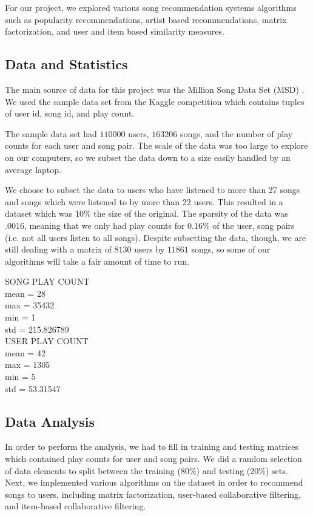 \documentclass[12pt,preprint]{aastex}
\begin{document}
For our project, we explored various song recommendation systems algorithms such as popularity recommendations, artist based recommendations, matrix factorization, and user and item based similarity measures.  

\subsection{Data and Statistics}
The main source of data for this project was the Million Song Data Set (MSD)  \citep{Bertin-Mahieux2011}. We used the sample data set from the Kaggle competition which contains tuples of user id, song id, and play count.  

The sample data set had $110000$ users, $163206$ songs, and the number of play counts for each user and song pair.
The scale of the data was too large to explore on our computers, so we subset the data down to a size easily handled by an average laptop. 

We choose to subset the data to users who have listened to more than 27 songs and songs which were listened to by more than 22 users. This resulted in a dataset which was 10\% the size of the original. The sparsity of the data was .0016, meaning that we only had play counts for 0.16\% of the user, song pairs (i.e. not all users listen to all songs). Despite subsetting the data, though, we are still dealing with a matrix of $8130$ users by $11861$ songs, so some of our algorithms will take a fair amount of time to run.


SONG PLAY COUNT  \\
mean = 28 \\
max = 35432 \\
min = 1 \\
std = 215.826789\\

USER PLAY COUNT\\
mean = 42\\
max = 1305\\
min = 5\\
std = 53.31547\\


\subsection{Data Analysis}
In order to perform the analysis, we had to fill in training and testing matrices which contained play counts for user and song pairs. We did a random selection of data elements to split between the training (80\%) and testing (20\%) sets. Next, we implemented various algorithms on the dataset in order to recommend songs to users, including matrix factorization, user-based collaborative filtering, and item-based collaborative filtering.
\end{document}
